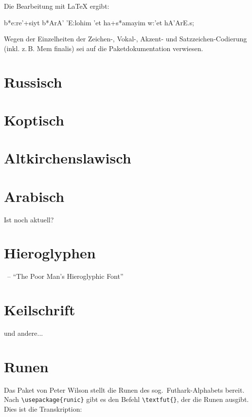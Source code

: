 Die Bearbeitung mit \LaTeX{} ergibt:

\begin{cjhebrew}
 b*e:re'+siyt b*ArA' 'E:lohim 'et ha+s*amayim w:'et hA'ArE.s;
\end{cjhebrew}

Wegen der Einzelheiten der Zeichen-, Vokal-, Akzent- und Satzzeichen-Codierung (inkl. z.\,B. 
Mem finalis) sei auf die Paketdokumentation verwiesen.

\section{Russisch}

\section{Koptisch}

\section{Altkirchenslawisch}



\section{Arabisch}

Ist  noch aktuell?

\section{Hieroglyphen}

~-- \enquote{The Poor Man’s Hieroglyphic Font}


 

\section{Keilschrift}

 und andere...

\section{Runen}

Das Paket  von Peter Wilson stellt die Runen des sog.\ Futhark-Alphabets bereit.
Nach \lstinline/\usepackage{runic}/ gibt es den Befehl \lstinline/\textfut{}/, der 
die Runen ausgibt. Dies ist die Transkription:


